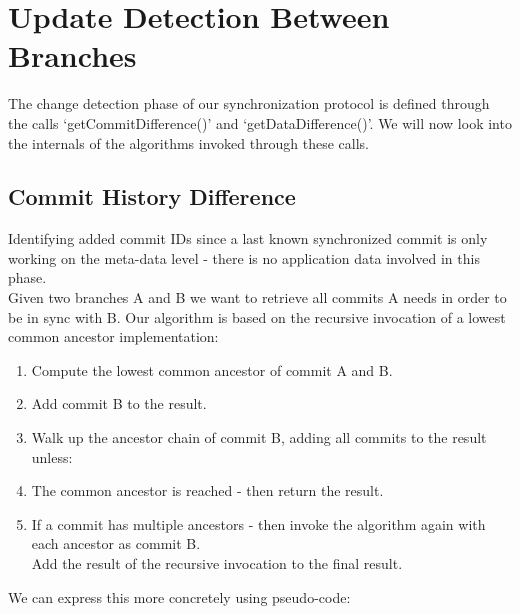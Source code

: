 
\section{Update Detection Between Branches}
\label{sec:histo.diff-across-commits}

The change detection phase of our synchronization protocol is defined through the calls `getCommitDifference()' and `getDataDifference()'.
We will now look into the internals of the algorithms invoked through these calls.\\

\subsection{Commit History Difference}
\label{sec:histo.graph-diff}
Identifying added commit IDs since a last known synchronized commit is only working on the meta-data level - there is no application data involved in this phase.\\
Given two branches A and B we want to retrieve all commits A needs in order to be in sync with B.
Our algorithm is based on the recursive invocation of a lowest common ancestor implementation:\\

\begin{enumerate}
\item Compute the lowest common ancestor of commit A and B.
\item Add commit B to the result.
\item Walk up the ancestor chain of commit B, adding all commits to the result unless:
\item The common ancestor is reached - then return the result.
\item If a commit has multiple ancestors - then invoke the algorithm again with each ancestor as commit B.\\
Add the result of the recursive invocation to the final result.
\end{enumerate}

We can express this more concretely using pseudo-code:\\

